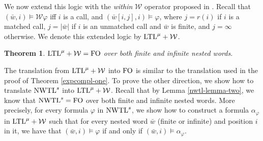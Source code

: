 \documentclass{LMCS}
\newcommand{\M}{{\mu}}
\newcommand{\w}{{\bar{w}}}
\newcommand{\WW}{{\mathcal{W}}}
\newcommand{\FO}{{\rm FO}}
\renewcommand{\phi}{\varphi}
\theoremstyle{plain}
\newtheorem{theorem}{Theorem}[section]
\theoremstyle{definition}
\newcommand{\ltlv}{\text{\rm LTL}^\M}
\newcommand{\ltlvp}{\ltlv}\newcommand{\nwtl}{\text{\rm NWTL}}
\newcommand{\nwtls}{\nwtl^s}
\begin{document}
We now extend this logic with the {\em within} $\WW$ operator proposed
in \cite{AEM04}. Recall that $(\w,i)\models\WW\phi$ iff $i$ is a call,
and $(\w[i,j],i)\models\phi$, where $j=r(i)$ if $i$ is a matched call,
$j=|\w|$ if $i$ is an unmatched call and $\w$ is finite, and $j =
\infty$ otherwise.
  We denote this extended logic by $\ltlv+\WW$.

\begin{theorem}
\label{within-thm}
$\ltlv+\WW=\FO$ over both finite and infinite nested words.
\end{theorem}

\proof
The translation from $\ltlvp+\WW$ into $\FO$ is similar to the
translation used in the proof of Theorem \ref{expcompl-one}. To prove
the other direction, we show how to translate $\nwtls$ into
$\ltlvp+\WW$. Recall that by Lemma \ref{nwtl-lemma-two}, we know that
$\nwtls = \FO$ over both finite and infinite nested words.  More
precisely, for every formula $\varphi$ in $\nwtls$, we show how to
construct a formula $\alpha_\varphi$ in $\ltlvp + \WW$ such that for
every nested word $\w$ (finite or infinite) and position $i$ in it, we
have that $(\w, i) \models \varphi$ if and only if $(\w, i) \models
\alpha_\varphi$.
\end{document}
